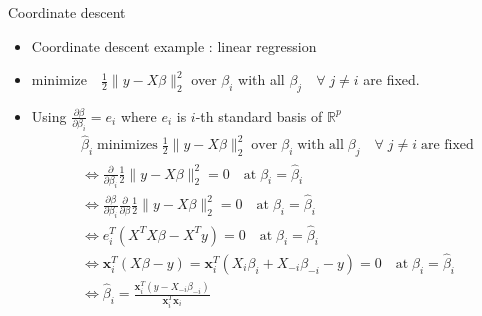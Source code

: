 \documentclass[11pt]{beamer}
\newcommand{\R}{\mathbb{R}}
\begin{document}
\begin{frame}{Coordinate descent}
    \begin{itemize}
        \item Coordinate descent example : linear regression
        \item $\text{minimize}\quad \frac 12 \|y-X\beta\|_2^2$ over $\beta_i$ with all $\beta_j\quad\forall \;j\neq i$ are fixed.
        \item Using $\frac{\partial \beta}{\partial \beta_i} = e_i$ where $e_i$ is $i$-th standard basis of $\R^p$
        \begin{align*}
            &\hat \beta_i \;\text{minimizes}\; \frac 12 \|y-X\beta\|_2^2 \;\text{over}\; \beta_i \;\text{with all}\; \beta_j\quad\forall \;j\neq i \;\text{are fixed} \\
            &\Leftrightarrow \frac{\partial}{\partial \beta_i}\frac 12 \|y-X\beta\|_2^2=0 \quad \text{at}\; \beta_i=\hat\beta_i \\
            &\Leftrightarrow \frac{\partial\beta}{\partial \beta_i} \frac{\partial}{\partial \beta}\frac 12 \|y-X\beta\|_2^2=0 \quad \text{at}\; \beta_i=\hat\beta_i \\
            &\Leftrightarrow e_i^T(X^TX\beta-X^Ty)=0 \quad \text{at}\; \beta_i=\hat\beta_i \\
            &\Leftrightarrow \mathbf{x}_i^T(X\beta-y)=\mathbf{x}_i^T (X_i\beta_i + X_{-i}\beta_{-i} -y)=0 \quad \text{at}\; \beta_i=\hat\beta_i \\
            &\Leftrightarrow \hat\beta_i=\frac{\mathbf{x}_i^T(y-X_{-i}\beta_{-i})}{\mathbf{x}_i^T\mathbf{x}_i}
        \end{align*}
    \end{itemize}
\end{frame}
\end{document}
